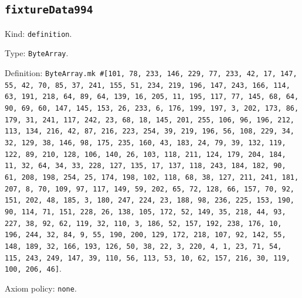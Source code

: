 \documentclass[11pt]{article}
\begin{document}
\subsection*{\texttt{fixtureData994}}
\noindent Kind: \texttt{definition}.\par
\noindent Type: \texttt{ByteArray}.\par
\noindent Definition: \texttt{ByteArray.mk \#[101, 78, 233, 146, 229, 77, 233, 42, 17, 147, 55, 42, 70, 85, 37, 241, 155, 51, 234, 219, 196, 147, 243, 166, 114, 63, 191, 218, 64, 89, 64, 139, 16, 205, 11, 195, 117, 77, 145, 68, 64, 90, 69, 60, 147, 145, 153, 26, 233, 6, 176, 199, 197, 3, 202, 173, 86, 179, 31, 241, 117, 242, 23, 68, 18, 145, 201, 255, 106, 96, 196, 212, 113, 134, 216, 42, 87, 216, 223, 254, 39, 219, 196, 56, 108, 229, 34, 32, 129, 38, 146, 98, 175, 235, 160, 43, 183, 24, 79, 39, 132, 119, 122, 89, 210, 128, 106, 140, 26, 103, 118, 211, 124, 179, 204, 184, 11, 32, 64, 34, 33, 228, 127, 135, 17, 137, 118, 243, 184, 182, 90, 61, 208, 198, 254, 25, 174, 198, 102, 118, 68, 38, 127, 211, 241, 181, 207, 8, 70, 109, 97, 117, 149, 59, 202, 65, 72, 128, 66, 157, 70, 92, 151, 202, 48, 185, 3, 180, 247, 224, 23, 188, 98, 236, 225, 153, 190, 90, 114, 71, 151, 228, 26, 138, 105, 172, 52, 149, 35, 218, 44, 93, 227, 38, 92, 62, 119, 32, 110, 3, 186, 52, 157, 192, 238, 176, 10, 196, 244, 32, 84, 9, 55, 190, 200, 129, 172, 218, 107, 92, 142, 55, 148, 189, 32, 166, 193, 126, 50, 38, 22, 3, 220, 4, 1, 23, 71, 54, 115, 243, 249, 147, 39, 110, 56, 113, 53, 10, 62, 157, 216, 30, 119, 100, 206, 46]}.\par
\noindent Axiom policy: \texttt{none}.\par
\end{document}
